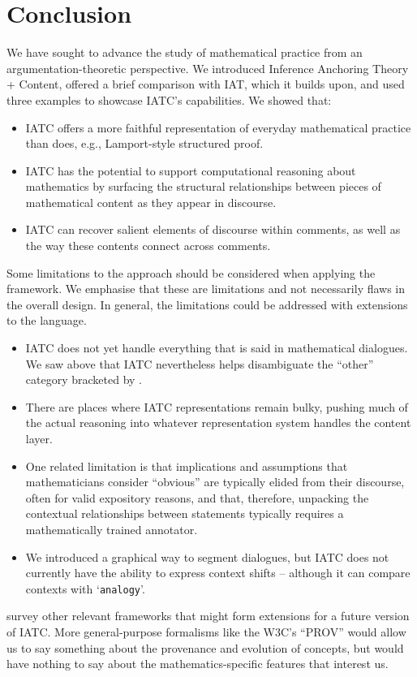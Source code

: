 \documentclass[smallextended,oneside]{svjour3}       %
\let\cite\citep
\newcommand\nothing[1]{#1}
\let\thesis\nothing
\let\paragraph\nothing
\begin{document}
{\FloatBarrier
\section{Conclusion}\label{discussion}

\thesis{We have sought to advance the study of mathematical practice from an argumentation-theoretic perspective.}
We introduced Inference Anchoring Theory + Content,
offered a brief comparison with IAT, which it builds upon,
and used three examples to showcase IATC's capabilities.
We showed that:
\begin{itemize}
\item IATC offers a more faithful representation of everyday mathematical
  practice than does, e.g., Lamport-style structured proof.
\item IATC has the potential to support computational reasoning about mathematics by
  surfacing the structural relationships between pieces of
  mathematical content as they appear in discourse.
\item IATC can recover salient elements of discourse within comments, as
  well as the way these contents connect across comments.
\end{itemize}

\paragraph{Some limitations to the approach should be considered when applying the framework.}
We emphasise that these are limitations and not necessarily flaws in the
overall design.  In general, the limitations could be addressed with
extensions to the language.
\begin{itemize}
\item {IATC does not yet handle everything that is said in mathematical dialogues.}
We saw above that IATC nevertheless helps disambiguate the ``other'' category
bracketed by \citet{pease-and-martin}.  
\item {There are places where IATC representations remain bulky, pushing much of the actual reasoning into whatever representation system handles the content layer.}
\item {One related limitation is that implications and assumptions that mathematicians consider ``obvious'' are
typically elided from their discourse, often for valid expository reasons, and that, therefore, unpacking the contextual relationships between statements
typically requires a mathematically trained annotator.}
\item {We introduced a graphical way to segment dialogues, but IATC does not currently have the ability to express context shifts -- although it can compare contexts with `\texttt{analogy}'.}
\end{itemize}
\citet{corneli2018social} survey other relevant frameworks that might
form extensions for a future version of IATC.
More general-purpose formalisms like the W3C's
``PROV'' \cite{groth2013prov} would allow us to say something about
the provenance and evolution of concepts, but would have nothing to
say about the mathematics-specific features that interest us.

}
\end{document}
